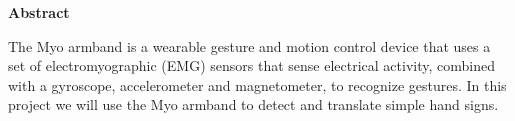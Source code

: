 \vspace*{\fill}
{\centering\huge\bfseries Abstract \par}
The Myo armband is a wearable gesture and motion control device that uses a set of electromyographic (EMG) sensors that sense electrical activity, combined with a gyroscope, accelerometer and magnetometer, to recognize gestures. In this project we will use the Myo armband to detect and translate simple hand signs. 
\vspace*{\fill}